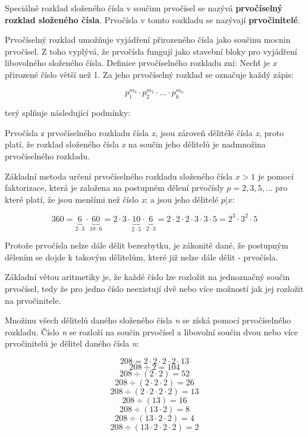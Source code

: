 Speciálně rozklad složeného čísla v součinu prvočísel se nazývá {\bf prvočíselný rozklad složeného čísla}. Prvočísla v tomto rozkladu se nazývají {\bf prvočinitelé}.

Prvočíselný rozklad umožňuje vyjádření přirozeného čísla jako součinu mocnin prvočísel. Z toho vyplývá, že prvočísla fungují jako stavební bloky pro vyjádření libovolného složeného čísla. Definice prvočíselného rozkladu zní: Nechť je {\it x} přirozené číslo větší než 1. Za jeho prvočíselný rozklad se označuje každý zápis:

$$ p_1^{m_3} \cdot p_2^{m_2} \cdot ... \cdot p_k^{m_n} $$

terý splňuje následující podmínky:

\vskip 4mm
\vskip 4mm

Prvočísla z prvočíselného rozkladu čísla {\it x}, jsou zároveň dělitélé čísla {\it x}, proto platí, že rozklad složeného čísla {\it x} na součin jeho dělitelů je nadmnožina prvočíselného rozkladu.

Základní metoda určení prvočíselného rozkladu složeného čísla $x>1$ je pomocí faktorizace, která je založena na postupném dělení prvočísly $p = 2, 3, 5, …$ pro které platí, že  jsou menšími než číslo {\it x}: a jsou jeho dělitelé $p | x$:

$$ 360 = \underbrace{6}_{2\cdot 3}\cdot \underbrace{60}_{10 \cdot 6} = 2 \cdot 3 \cdot \underbrace{10}_{2\cdot 5} \cdot \underbrace{6}_{2\cdot 3} = 2\cdot 2 \cdot 2 \cdot 3 \cdot 3 \cdot 5 = 2^3 \cdot 3^2 \cdot 5 $$

Protože prvočísla nelze dále dělit bezezbytku, je zákonitě dané, že postupným dělením se dojde k takovým dělitelům, které již nelze dále dělit - prvočísla.

Základní větou aritmetiky je, že každé číslo lze rozložit na jednoznačný součin prvočísel, tedy že pro jedno číslo neexistují dvě nebo více možností jak jej rozložit na prvočinitele.

Množinu všech dělitelů daného složeného čísla {\it n} se získá pomocí prvočíselného rozkladu. Číslo {\it n} se rozloží na součin prvočísel a libovolní součin dvou nebo více prvočinitelů je dělitel daného čísla {\it n}:

$$ 208 = 2\cdot 2\cdot 2\cdot 2\cdot 13 $$
$$ 208 \div 2 = 104 $$
$$ 208 \div (2 \cdot 2) = 52 $$
$$ 208 \div (2 \cdot 2 \cdot 2) = 26 $$
$$ 208 \div (2 \cdot 2 \cdot 2 \cdot 2) = 13 $$
$$ 208 \div (13) = 16 $$
$$ 208 \div (13 \cdot 2) = 8 $$
$$ 208 \div (13\cdot 2 \cdot 2) = 4 $$
$$ 208 \div (13\cdot 2\cdot 2 \cdot 2) = 2 $$

